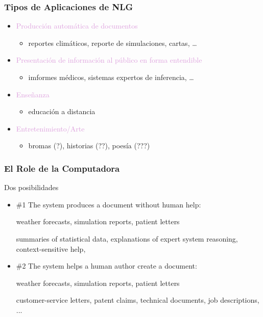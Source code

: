 \documentclass[compress,color=usenames]{beamer}
\newcommand{\mH}[1]{\textcolor{Plum}{#1}}
\begin{document}
\begin{frame}
\frametitle{Tipos de Aplicaciones de NLG}

\begin{itemize}
\item \mH{Producci\'on autom\'atica de documentos}
\begin{itemize}
\item reportes clim\'aticos, reporte de simulaciones, cartas, \ldots
\end{itemize}
\item \mH{Presentaci\'on de informaci\'on al p\'ublico en forma entendible}
\begin{itemize}
\item imformes m\'edicos, sistemas expertos de inferencia, \ldots
\end{itemize}
\item \mH{Ense\~nanza}
\begin{itemize}
\item educaci\'on a distancia
\end{itemize}
\item \mH{Entretenimiento/Arte}
\begin{itemize}
\item bromas (?), historias (??), poes\'ia (???)
\end{itemize}
\end{itemize}

\end{frame}

\begin{frame}
\frametitle{El Role de la Computadora}

 Dos posibilidades
\begin{itemize}
\item { {\#1 The system produces a document without human help: }}

 { {weather forecasts, simulation reports, patient letters}}

 { {summaries of statistical data, explanations of expert system reasoning, context-sensitive help, }}

\item { {\#2 The system helps a human author create a document:}}

 { {weather forecasts, simulation reports, patient letters}}

 { {customer-service letters, patent claims, technical documents, job descriptions, ...}}
\end{itemize}

\end{frame}
\end{document}
